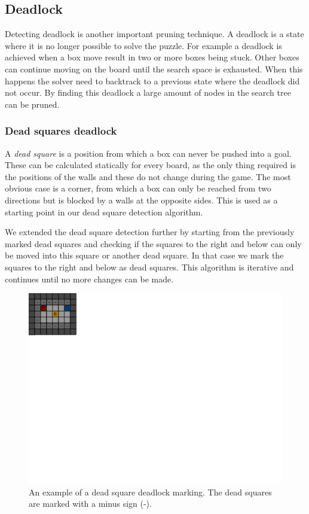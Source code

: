 \documentclass[a4paper,11pt]{article}
\renewcommand{\*}[0]{\cdot}
\begin{document}
\subsection{Deadlock}

Detecting deadlock is another important pruning technique. A deadlock is a
state where it is no longer possible to solve the puzzle. For example a deadlock
is achieved when a box move result in two or more boxes being stuck. Other boxes
can continue moving on the board until the search space is exhausted. When this
happens the solver need to backtrack to a previous state where the deadlock did
not occur. By finding this deadlock a large amount of nodes in the search tree
can be pruned.

\subsubsection{Dead squares deadlock}

A \emph{dead square} is a position from which a box can never be pushed into a
goal. These can be calculated statically for every board, as the only thing
required is the positions of the walls and these do not change during the game.
The most obvious case is a corner, from which a box can only be reached from two
directions but is blocked by a walls at the opposite sides. This is used as a
starting point in our dead square detection algorithm.

We extended the dead square detection further by starting from the previously
marked dead squares and checking if the squares to the right and below can only
be moved into this square or another dead square. In that case we mark the
squares to the right and below as dead squares. This algorithm is iterative and
continues until no more changes can be made.

\begin{figure}[h!]
    \begin{center}
        \includegraphics{figures/deadSquareDeadlock}
    \end{center}
    \caption{An example of a dead square deadlock marking. The dead squares are
    marked with a minus sign (-).}
    \label{fig:deadSquareDeadlock}
\end{figure}
\end{document}
